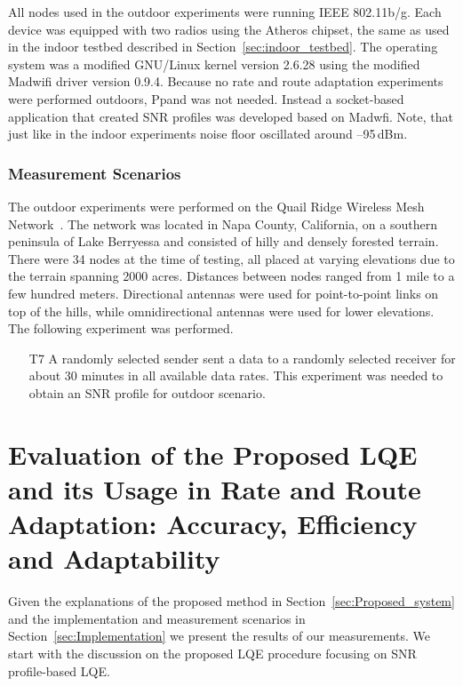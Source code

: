 \documentclass[11pt,draftclsnofoot,journal,onecolumn]{IEEEtran}
\begin{document}
All nodes used in the outdoor experiments were running IEEE 802.11b/g. Each device was equipped with two radios using the Atheros chipset, the same as used in the indoor testbed described in Section~\ref{sec:indoor_testbed}. The operating system was a modified GNU/Linux kernel version 2.6.28 using the modified Madwifi driver version 0.9.4. Because no rate and route adaptation experiments were performed outdoors, Ppand was not needed. Instead a socket-based application that created SNR profiles was developed based on Madwfi. Note, that just like in the indoor experiments noise floor oscillated around --95\,dBm.

\subsubsection{Measurement Scenarios}
\label{sec:scenarios_outdoor}

The outdoor experiments were performed on the Quail Ridge Wireless Mesh Network~\cite{wu_tridentcom_2007}. The network was located in Napa County, California, on a southern peninsula of Lake Berryessa and consisted of hilly and densely forested terrain. There were 34 nodes at the time of testing, all placed at varying elevations due to the terrain spanning 2000 acres. Distances between nodes ranged from 1 mile to a few hundred meters. Directional antennas were used for point-to-point links on top of the hills, while omnidirectional antennas were used for lower elevations. The following experiment was performed.

\begin{itemize}

\item[T7] A randomly selected sender sent a data to a randomly selected receiver for about 30 minutes in all available data rates. This experiment was needed to obtain an SNR profile for outdoor scenario.

\end{itemize}

\section{Evaluation of the Proposed LQE and its Usage in Rate and Route Adaptation: Accuracy, Efficiency and Adaptability}
\label{sec:Evaluation}

Given the explanations of the proposed method in Section~\ref{sec:Proposed_system} and the implementation and measurement scenarios in Section~\ref{sec:Implementation} we present the results of our measurements. We start with the discussion on the proposed LQE procedure focusing on SNR profile-based LQE.
\end{document}
